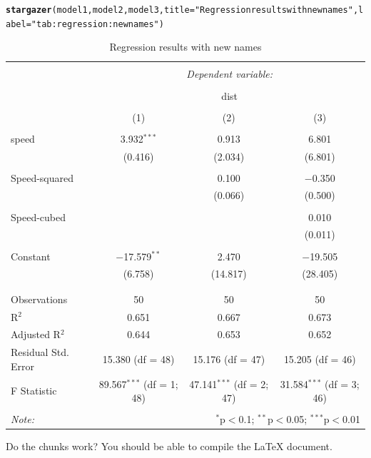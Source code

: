 \documentclass{article}\usepackage[]{graphicx}\usepackage[]{color}
\makeatletter
\newcommand{\hlstr}[1]{\textcolor[rgb]{0.192,0.494,0.8}{#1}}%
\newcommand{\hlstd}[1]{\textcolor[rgb]{0.345,0.345,0.345}{#1}}%
\newcommand{\hlkwc}[1]{\textcolor[rgb]{0.333,0.667,0.333}{#1}}%
\newcommand{\hlkwd}[1]{\textcolor[rgb]{0.737,0.353,0.396}{\textbf{#1}}}%
\newenvironment{kframe}{%
 \def\at@end@of@kframe{}%
 \ifinner\ifhmode%
  \def\at@end@of@kframe{\end{minipage}}%
  \begin{minipage}{\columnwidth}%
 \fi\fi%
 \def\FrameCommand##1{\hskip\@totalleftmargin \hskip-\fboxsep
 \colorbox{shadecolor}{##1}\hskip-\fboxsep
     \hskip-\linewidth \hskip-\@totalleftmargin \hskip\columnwidth}%
 \MakeFramed {\advance\hsize-\width
   \@totalleftmargin\z@ \linewidth\hsize
   \@setminipage}}%
 {\par\unskip\endMakeFramed%
 \at@end@of@kframe}
\makeatother
\begin{document}
\begin{kframe}
\begin{alltt}
\hlkwd{stargazer}\hlstd{(model1, model2, model3,} \hlkwc{title}\hlstd{=}\hlstr{"Regression results with new names"}\hlstd{,} \hlkwc{label}\hlstd{=}\hlstr{"tab:regression:newnames"}\hlstd{)}
\end{alltt}
\end{kframe}
\begin{table}[!htbp] \centering 
  \caption{Regression results with new names} 
  \label{tab:regression:newnames} 
\begin{tabular}{@{\extracolsep{5pt}}lccc} 
\\[-1.8ex]\hline 
\hline \\[-1.8ex] 
 & \multicolumn{3}{c}{\textit{Dependent variable:}} \\ 
\cline{2-4} 
\\[-1.8ex] & \multicolumn{3}{c}{dist} \\ 
\\[-1.8ex] & (1) & (2) & (3)\\ 
\hline \\[-1.8ex] 
 speed & 3.932$^{***}$ & 0.913 & 6.801 \\ 
  & (0.416) & (2.034) & (6.801) \\ 
  & & & \\ 
 Speed-squared &  & 0.100 & $-$0.350 \\ 
  &  & (0.066) & (0.500) \\ 
  & & & \\ 
 Speed-cubed &  &  & 0.010 \\ 
  &  &  & (0.011) \\ 
  & & & \\ 
 Constant & $-$17.579$^{**}$ & 2.470 & $-$19.505 \\ 
  & (6.758) & (14.817) & (28.405) \\ 
  & & & \\ 
\hline \\[-1.8ex] 
Observations & 50 & 50 & 50 \\ 
R$^{2}$ & 0.651 & 0.667 & 0.673 \\ 
Adjusted R$^{2}$ & 0.644 & 0.653 & 0.652 \\ 
Residual Std. Error & 15.380 (df = 48) & 15.176 (df = 47) & 15.205 (df = 46) \\ 
F Statistic & 89.567$^{***}$ (df = 1; 48) & 47.141$^{***}$ (df = 2; 47) & 31.584$^{***}$ (df = 3; 46) \\ 
\hline 
\hline \\[-1.8ex] 
\textit{Note:}  & \multicolumn{3}{r}{$^{*}$p$<$0.1; $^{**}$p$<$0.05; $^{***}$p$<$0.01} \\ 
\end{tabular} 
\end{table} 



Do the chunks work? You should be able to compile the \LaTeX{} document.
\end{document}
